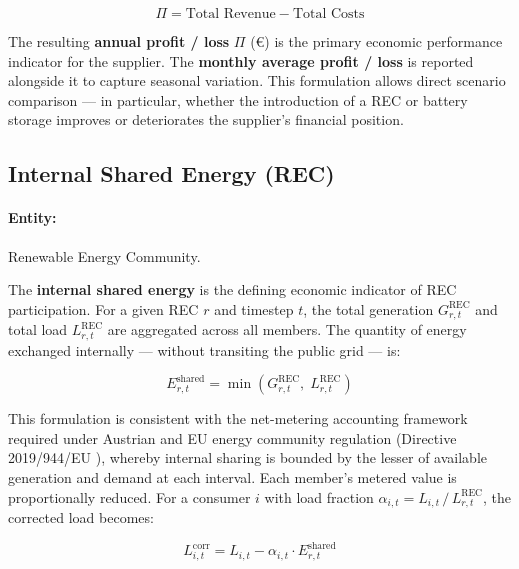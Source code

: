\begin{equation}
    \Pi = \text{Total Revenue} - \text{Total Costs}
    \label{eq:profit_loss}
\end{equation}

The resulting \textbf{annual profit / loss} $\Pi$ (\euro) is the primary economic performance indicator for the supplier. The \textbf{monthly average profit / loss} is reported alongside it to capture seasonal variation. This formulation allows direct scenario comparison — in particular, whether the introduction of a REC or battery storage improves or deteriorates the supplier's financial position.

\subsection{Internal Shared Energy (REC)}
\label{sec:kpi_shared_energy}

\paragraph{Entity:} Renewable Energy Community.

The \textbf{internal shared energy} is the defining economic indicator of REC participation. For a given REC $r$ and timestep $t$, the total generation $G^{\mathrm{REC}}_{r,t}$ and total load $L^{\mathrm{REC}}_{r,t}$ are aggregated across all members. The quantity of energy exchanged internally — without transiting the public grid — is:

\begin{equation}
    E^{\mathrm{shared}}_{r,t} = \min\!\left(G^{\mathrm{REC}}_{r,t},\; L^{\mathrm{REC}}_{r,t}\right)
    \label{eq:shared_energy}
\end{equation}

This formulation is consistent with the net-metering accounting framework required under Austrian and EU energy community regulation (Directive 2019/944/EU \cite{EU2019944}), whereby internal sharing is bounded by the lesser of available generation and demand at each interval. Each member's metered value is proportionally reduced. For a consumer $i$ with load fraction $\alpha_{i,t} = L_{i,t}\, /\, L^{\mathrm{REC}}_{r,t}$, the corrected load becomes:

\begin{equation}
    L^{\mathrm{corr}}_{i,t} = L_{i,t} - \alpha_{i,t} \cdot E^{\mathrm{shared}}_{r,t}
    \label{eq:corrected_load}
\end{equation}

